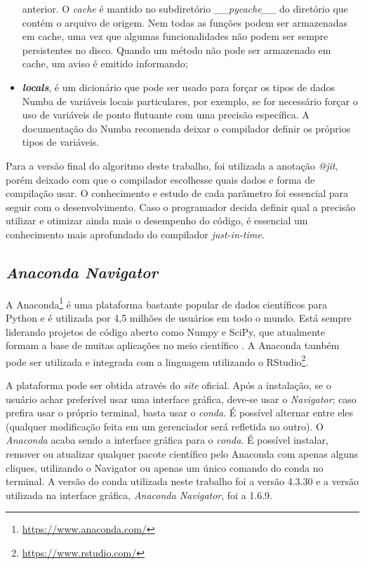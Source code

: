 \documentclass[
	12pt,				%
	twoside,			%
	a4paper,			%
	english,			%
	french,				%
	spanish,			%
	brazil				%
	]{abntex2}
\begin{document}
\begin{itemize}
  anterior. O \emph{cache} é mantido no subdiretório
  \emph{\_\_pycache\_\_} do diretório que contém o arquivo de origem.
  Nem todas as funções podem ser armazenadas em cache, uma vez que
  algumas funcionalidades não podem ser sempre persistentes no disco.
  Quando um método não pode ser armazenado em cache, um aviso é emitido
  informando;
\item
  \textbf{\emph{locals}}, é um dicionário que pode ser usado para forçar
  os tipos de dados Numba de variáveis locais particulares, por exemplo,
  se for necessário forçar o uso de variáveis de ponto flutuante com uma
  precisão específica. A documentação do Numba recomenda deixar o
  compilador definir os próprios tipos de variáveis.
\end{itemize}

Para a versão final do algoritmo deste trabalho, foi utilizada a
anotação \emph{@jit}, porém deixado com que o compilador escolhesse
quais dados e forma de compilação usar. O conhecimento e estudo de cada
parâmetro foi essencial para seguir com o desenvolvimento. Caso o
programador decida definir qual a precisão utilizar e otimizar ainda
mais o desempenho do código, é essencial um conhecimento mais
aprofundado do compilador \emph{just-in-time}.

\subsection{\texorpdfstring{\emph{Anaconda
Navigator}}{Anaconda Navigator}}\label{anaconda-navigator}

A Anaconda\footnote{\url{https://www.anaconda.com/}} é uma plataforma
bastante popular de dados científicos para Python e é utilizada por 4,5
milhões de usuários em todo o mundo. Está sempre liderando projetos de
código aberto como Numpy e SciPy, que atualmente formam a base de muitas
aplicações no meio científico \cite{ANACONDA}. A Anaconda também pode
ser utilizada e integrada com a linguagem utilizando o RStudio\footnote{\url{https://www.rstudio.com/}}.

A plataforma pode ser obtida através do \emph{site} oficial. Após a
instalação, se o usuário achar preferível usar uma interface gráfica,
deve-se usar o \emph{Navigator}; caso prefira usar o próprio terminal,
basta usar o \emph{conda}. É possível alternar entre eles (qualquer
modificação feita em um gerenciador será refletida no outro). O
\emph{Anaconda} acaba sendo a interface gráfica para o \emph{conda}. É
possível instalar, remover ou atualizar qualquer pacote científico pelo
Anaconda com apenas alguns cliques, utilizando o Navigator ou apenas um
único comando do conda no terminal. A versão do conda utilizada neste
trabalho foi a versão 4.3.30 e a versão utilizada na interface gráfica,
\emph{Anaconda Navigator}, foi a 1.6.9.
\end{document}
